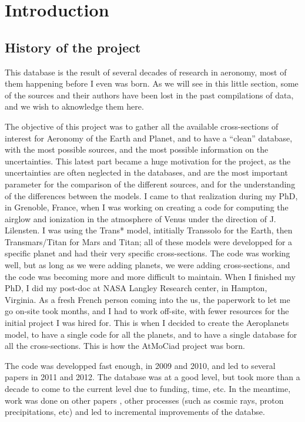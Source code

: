 \section*{Introduction}


\subsection{History of the project}

This database is the result of several decades of research in aeronomy, most of them happening before I even was born. 
As we will see in this little section, some of the sources and their authors have been lost in the past compilations of data, and we wish to aknowledge them here.

The objective of this project was to gather all the available cross-sections of interest for Aeronomy of the Earth and Planet, and to have a ``clean'' database, with the most possible sources, and the most possible information on the uncertainties.
This latest part became a huge motivation for the project, as the uncertainties are often neglected in the databases, and are the most important parameter for the comparison of the different sources, and for the understanding of the differences between the models.
I came to that realization during my PhD, in Grenoble, France, when I was working on creating a code for computing the airglow and ionization in the atmosphere of Venus under the direction of J. Lilensten. I was using the Trans* model, intitially Transsolo for the Earth, then Transmars/Titan for Mars and Titan; all of these models were developped for a specific planet and had their very specific cross-sections. The code was working well, but as long as we were adding planets, we were adding cross-sections, and the code was becoming more and more difficult to maintain.
When I finished my PhD, I did my post-doc at NASA Langley Research center, in Hampton, Virginia. As a fresh French person coming into the us, the paperwork to let me go on-site took months, and I had to work off-site, with fewer resources for the initial project I was hired for. This is when I decided to create the Aeroplanets model, to have a single code for all the planets, and to have a single database for all the cross-sections. This is how the AtMoCiad project was born.

The code was developped fast enough, in 2009 and 2010, and led to several papers in 2011 and 2012. The database was at a good level, but took more than a decade to come to the current level due to funding, time, etc. In the meantime, work was done on other papers \citep{gronoff2020}, other processes (such as cosmic rays, proton precipitations, etc) and led to incremental improvements of the databse.

